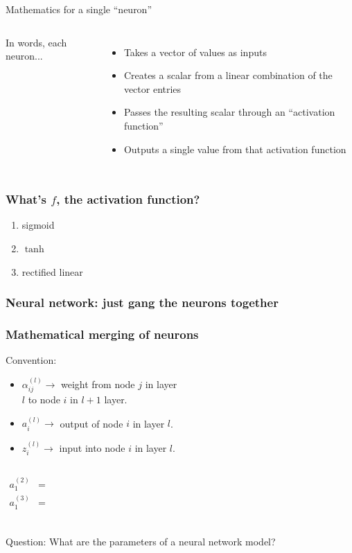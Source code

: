 \documentclass[mathserif, aspectratio=169]{beamer}
\begin{document}
\begin{frame}{Mathematics for a single ``neuron''}   
    \begin{columns}
    		In words, each neuron...
    		\begin{itemize}
    			\item Takes a vector of values as inputs
    			\item Creates a scalar from a linear combination of the vector entries
    			\item Passes the resulting scalar through an ``activation function''
    			\item Outputs a single value from that activation function
    		\end{itemize}
	    	
    \end{columns}
\end{frame}


\begin{frame}[t]\frametitle{What's $f$, the activation function?}
    \begin{enumerate}
    	\item sigmoid
    	\vspace{15mm}
    	\item $\tanh$
    	\vspace{15mm}
    	\item rectified linear
    \end{enumerate}
\end{frame}

\begin{frame}[t]\frametitle{Neural network: just gang the neurons together}
    
\end{frame}

\begin{frame}[t]\frametitle{Mathematical merging of neurons}
    Convention:
    \begin{itemize}
    	\item $\alpha_{ij}^{(l)} \rightarrow$ weight from node $j$ in layer\\ $l$ to node $i$ in $l+1$ layer.
    	\item $a_{i}^{(l)} \rightarrow$ output of node $i$ in layer $l$.
    	\item $z_i^{(l)} \rightarrow$ input into node $i$ in layer $l$.
    \end{itemize}

    \begin{columns}
    	    \begin{align*}
		     	a_1^{(2)} &= \\
		     	a_1^{(3)} &= \\
		    \end{align*}
    \end{columns}
    
    Question: What are the parameters of a neural network model?
\end{frame}
\end{document}

